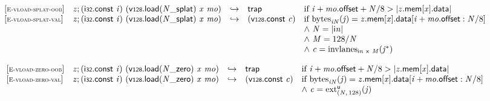 $$
\begin{array}{@{}l@{}lcl@{}l@{}}
{[\textsc{\scriptsize E{-}vload{-}splat{-}oob}]} \quad & {\mathit{z}} ; (\mathsf{i{\scriptstyle32}}.\mathsf{const}~{\mathit{i}})~({\mathsf{v{\scriptstyle128}.load}}{({{{\mathit{N}}}{\mathsf{\_}}}{\mathsf{splat}})}~{\mathit{x}}~{\mathit{mo}}) &\hookrightarrow& \mathsf{trap} &\quad
  \mbox{if}~{\mathit{i}} + {\mathit{mo}}.\mathsf{offset} + {\mathit{N}} / 8 > {|{{\mathit{z}}.\mathsf{mem}}{[{\mathit{x}}]}.\mathsf{data}|} \\
{[\textsc{\scriptsize E{-}vload{-}splat{-}val}]} \quad & {\mathit{z}} ; (\mathsf{i{\scriptstyle32}}.\mathsf{const}~{\mathit{i}})~({\mathsf{v{\scriptstyle128}.load}}{({{{\mathit{N}}}{\mathsf{\_}}}{\mathsf{splat}})}~{\mathit{x}}~{\mathit{mo}}) &\hookrightarrow& (\mathsf{v{\scriptstyle128}}.\mathsf{const}~{\mathit{c}}) &\quad
  \mbox{if}~{{\mathrm{bytes}}}_{{{\mathit{i}}}{{\mathit{N}}}}({\mathit{j}}) = {{\mathit{z}}.\mathsf{mem}}{[{\mathit{x}}]}.\mathsf{data}[{\mathit{i}} + {\mathit{mo}}.\mathsf{offset} : {\mathit{N}} / 8] \\
 &&&&\quad {\land}~{\mathit{N}} = {|{\mathsf{i}}{{\mathit{n}}}|} \\
 &&&&\quad {\land}~{\mathit{M}} = 128 / {\mathit{N}} \\
 &&&&\quad {\land}~{\mathit{c}} = {{\mathrm{invlanes}}}_{{\mathsf{i}}{{\mathit{n}}}~\mathsf{x}~{\mathit{M}}}({{\mathit{j}}^\ast}) \\
\end{array}
$$

\vspace{1ex}

$$
\begin{array}{@{}l@{}lcl@{}l@{}}
{[\textsc{\scriptsize E{-}vload{-}zero{-}oob}]} \quad & {\mathit{z}} ; (\mathsf{i{\scriptstyle32}}.\mathsf{const}~{\mathit{i}})~({\mathsf{v{\scriptstyle128}.load}}{({{{\mathit{N}}}{\mathsf{\_}}}{\mathsf{zero}})}~{\mathit{x}}~{\mathit{mo}}) &\hookrightarrow& \mathsf{trap} &\quad
  \mbox{if}~{\mathit{i}} + {\mathit{mo}}.\mathsf{offset} + {\mathit{N}} / 8 > {|{{\mathit{z}}.\mathsf{mem}}{[{\mathit{x}}]}.\mathsf{data}|} \\
{[\textsc{\scriptsize E{-}vload{-}zero{-}val}]} \quad & {\mathit{z}} ; (\mathsf{i{\scriptstyle32}}.\mathsf{const}~{\mathit{i}})~({\mathsf{v{\scriptstyle128}.load}}{({{{\mathit{N}}}{\mathsf{\_}}}{\mathsf{zero}})}~{\mathit{x}}~{\mathit{mo}}) &\hookrightarrow& (\mathsf{v{\scriptstyle128}}.\mathsf{const}~{\mathit{c}}) &\quad
  \mbox{if}~{{\mathrm{bytes}}}_{{{\mathit{i}}}{{\mathit{N}}}}({\mathit{j}}) = {{\mathit{z}}.\mathsf{mem}}{[{\mathit{x}}]}.\mathsf{data}[{\mathit{i}} + {\mathit{mo}}.\mathsf{offset} : {\mathit{N}} / 8] \\
 &&&&\quad {\land}~{\mathit{c}} = {{{{\mathrm{ext}}}_{({\mathit{N}},\, 128)}^{\mathsf{u}}}}{({\mathit{j}})} \\
\end{array}
$$

